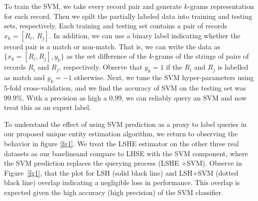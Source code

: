 \documentclass{imsart}
\begin{document}
To train the SVM, we take every record pair and generate $k$-grams representation for each record. Then we spilt the partially labeled data into training and testing sets, respectively. Each training and testing set contains a pair of records $x_k = [R_i,\ R_j]$. In addition, we can use a binary label indicating whether the record pair is a match or non-match. That is, we can write the data as $\{x_k =[R_i,R_j],y_k\}$ as the set difference of the $k$-grams of the strings of pairs of records $R_i$ and $R_j$, respectively. Observe that $y_k = 1$ if the $R_i$ and $R_j$ is labelled as match and $y_k = -1$ otherwise. Next, we tune the SVM hyper-parameters using 5-fold cross-validation, and we find the accuracy of SVM on the testing set was 99.9\%.  With a precision as high a 0.99, we can reliably query an SVM and now treat this as an expert label.



%
%


To understand the effect of using SVM prediction as a proxy to label queries in our proposed unique entity estimation algorithm, we return to observing the behavior in figure \ref{fg1}. We treat the LSHE estimator on the other three real datasets as our baselineand compare to LHSE with the SVM component, where the SVM prediction replaces the querying process (LSHE +SVM). Observe in  Figure~\ref{fg1}, that the plot for LSH (solid black line) and LSH+SVM (dotted black line) overlap indicating a negligible loss in performance. This overlap is expected given the high accuracy (high precision) of the SVM classifier.
\end{document}
